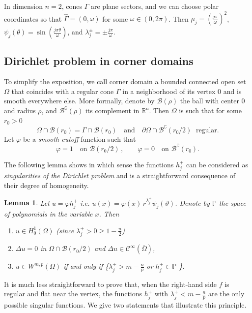 \documentclass[titlepage,12pt]{amsart}
\newtheorem{lemma}[theorem]{Lemma}
\theoremstyle{definition}
\theoremstyle{remark}
\numberwithin{equation}{section}
\newcommand\bP{{\mathbb P}}
\newcommand\R{{\mathbb R}}
\newcommand{\sC}{{\mathscr C}}
\newcommand{\sB}{{\mathscr B}}
\begin{document}
In dimension $n=2$, cones $\Gamma$ are plane sectors, and we can choose polar coordinates so that $\widehat\Gamma=(0,\omega)$ for some $\omega\in(0,2\pi)$. Then
$\mu_j = \left(\frac{j\pi}{\omega}\right)^2$, 
$\psi_j(\theta) = \sin\left(\frac{j\pi\theta}{\omega}\right)$, and
$\lambda^\pm_j = \pm \frac{j\pi}{\omega}$.


\subsection{Dirichlet problem in corner domains}
To simplify the exposition, we call corner domain a bounded connected open set $\Omega$ that coincides with a regular cone $\Gamma$ in a neighborhood of its vertex $0$ and is smooth everywhere else. More formally, denote by $\sB(\rho)$ the ball with center $0$ and radius $\rho$, and $\sB^\complement(\rho)$ its complement in $\R^n$.
Then $\Omega$ is such that for some $r_0>0$
\[
   \Omega\cap\sB(r_0)=\Gamma\cap\sB(r_0) \quad\mbox{and}\quad
   \partial\Omega \cap \sB^\complement(r_0/2) \;\mbox{ regular}.
\]
Let $\varphi$ be a {\em smooth cutoff} function such that
\begin{equation}
\label{eq:phi}
\varphi = 1 \quad \mbox{on }  \sB(r_0/2)\, , \qquad 
\varphi = 0 \quad \mbox{on }  \sB^\complement(r_0).
\end{equation}

The following lemma shows in which sense the functions $h^+_j$ can be considered as {\em singularities of the Dirichlet problem} and is a straightforward consequence of their degree of homogeneity.

\begin{lemma}
\label{lem:2.1}
Let $u = \varphi h^+_j$ i.e. $u(x)=\varphi(x)\, r^{\lambda^+_j}\psi_j(\vartheta)$. 
Denote by $\bP$ the space of polynomials in the variable $x$. Then
\begin{enumerate}
\item $u\in H^1_0(\Omega)$ (since $\lambda^+_j>0\ge 1-\frac{n}{2}$)
\item $\Delta u= 0$ in $\Omega\cap\sB(r_0/2)$ and $\Delta u\in \sC^\infty(\overline\Omega)$,
\item $u\in W^{m,p}(\Omega)$ \;if and only if\; 
      \{$\lambda^+_j>m-\frac{n}{p}$ \;\;or\;\; $h^+_j\in\bP$ \}.
\end{enumerate}
\end{lemma}

It is much less straightforward to prove that, when the right-hand side $f$ is regular and flat near the vertex, the functions $h^+_j$ with $\lambda^+_j<m-\frac{n}{p}$ are the only possible singular functions. We give two statements that illustrate this principle.
\end{document}
